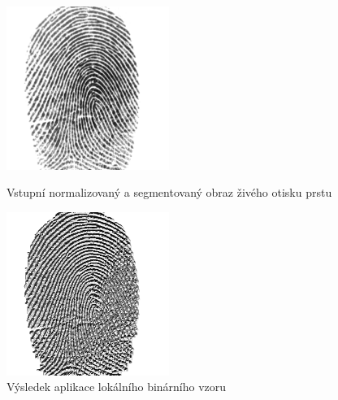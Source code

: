 \begin{figure}[htbp]
  \begin{minipage}[b]{0.5\linewidth}
    \centering
    \includegraphics[width=200]{obrazky-figures/107_7.png}
    \caption{Vstupní normalizovaný a segmentovaný obraz živého otisku prstu}
    \label{fig:origimg107}
  \end{minipage}
  \hspace{0.5cm}
  \begin{minipage}[b]{0.5\linewidth}
    \centering
    \includegraphics[width=200]{obrazky-figures/107_7lbp.png}
    \caption{Výsledek aplikace lokálního binárního vzoru}
    \label{fig:lbplive}
  \end{minipage}
\end{figure}


